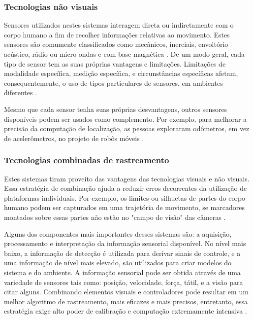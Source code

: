 \subsubsection{Tecnologias não visuais}\label{sec:tec-vis}
Sensores utilizados nestes sistemas interagem direta ou indiretamente com o corpo humano a fim de recolher informações relativas ao movimento. Estes sensores são comumente classificados como mecânicos, inerciais, envoltório acústico, rádio ou micro-ondas e com base magnética \cite{zhou2008human}. De um modo geral, cada tipo de sensor tem as suas próprias vantagens e limitações. Limitações de modalidade específica, medição específica, e circunstâncias específicas afetam, consequentemente, o uso de tipos particulares de sensores, em ambientes diferentes \cite{Welch:2002}.

Mesmo que cada sensor tenha suas próprias desvantagens, outros sensores disponíveis podem ser usados como complemento. Por exemplo, para melhorar a precisão da computação de localização, as pessoas exploraram odômetros, em vez de acelerômetros, no projeto de robôs móveis \cite{zhou2008human}.

\subsubsection{Tecnologias combinadas de rastreamento}\label{sec:rastre-robo}
Estes sistemas tiram proveito das vantagens das tecnologias visuais e não visuais. Essa estratégia de combinação ajuda a reduzir erros decorrentes da utilização de plataformas individuais. Por exemplo, os limites ou silhuetas de partes do corpo humano podem ser capturados em uma trajetória de movimento, se marcadores montados sobre essas partes não estão no "campo de visão" das câmeras \cite{zhou2008human}.

Alguns dos componentes mais importantes desses sistemas são: a aquisição, processamento e interpretação da informação sensorial disponível. No nível mais baixo, a informação de detecção é utilizada para derivar sinais de controle, e a uma informação de nível mais elevado, são utilizados para criar modelos do sistema e do ambiente. A informação sensorial pode ser obtida através de uma variedade de sensores tais como: posição, velocidade, força, tátil, e a visão para citar alguns. Combinando elementos visuais e controladores pode resultar em um melhor algoritmo de rastreamento, mais eficazes e mais precisos, entretanto, essa estratégia exige alto poder de calibração e computação extremamente intensiva \cite{papanikolopoulos1993visual}.

